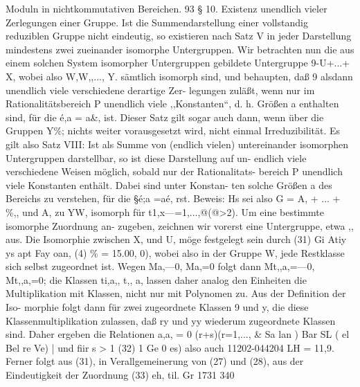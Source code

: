 \documentclass[11pt,a4paper]{article}
\theoremstyle{plain}
\theoremstyle{definition}
\begin{document}
Moduln in nichtkommutativen Bereichen. 
93 
\S{} 10. 
Existenz unendlich vieler Zerlegungen einer Gruppe. 
Ist die Summendarstellung einer vollstandig reduziblen Gruppe nicht 
eindeutig, 
so 
existieren nach Satz V in jeder Darstellung mindestens 
zwei zueinander 
isomorphe Untergruppen. 
Wir betrachten nun 
die aus 
einem solchen System isomorpher Untergruppen gebildete Untergruppe 
9-U+...+ X, wobei also W,W,,..., Y. sämtlich isomorph sind, 
und behaupten, daß 9 alsdann unendlich viele verschiedene derartige Zer- 
legungen 
zuläßt, wenn 
nur 
im Rationalitätsbereich 
P unendlich 
viele 
,,Konstanten``, d. h. Größen a enthalten sind, für die é,a = a\&, ist. Dieser 
Satz 
gilt sogar auch dann, wenn 
über die Gruppen Y\%; nichts weiter 
vorausgesetzt wird, nicht einmal Irreduzibilität. 
Es gilt also 
Satz VIII: 
Ist  als Summe von (endlich vielen) untereinander 
isomorphen Untergruppen darstellbar, so ist diese Darstellung auf un- 
endlich viele verschiedene Weisen möglich, sobald nur 
der Rationalitats- 
bereich P unendlich viele Konstanten enthält. 
Dabei sind unter Konstan- 
ten solche Größen a des Bereichs zu verstehen, für die \S{}é;a =aé, rst. 
Beweis: Hs sei also G = A, + ... + \%,, und A, zu YW, isomorph für 
t1,x---=1,...,@(@>2). 
Um eine bestimmte isomorphe Zuordnung an- 
zugeben, 
zeichnen 
wir 
vorerst 
eine Untergruppe, 
etwa ,, aus. 
Die 
Isomorphie zwischen X, und U, möge festgelegt sein durch 
(31) 
Gi 
Atiy ys 
apt Fay oan, 
(4) \% = 15.00, 
0), 
wobei also in der Gruppe W, jede Restklasse sich selbst zugeordnet ist. 
Wegen Ma,---0, Ma,=0 
folgt 
dann 
Mt,,a,=---0, Mt,,a,=0; 
die 
Klassen ti,a,, t,, 
a, lassen daher analog den Einheiten die Multiplikation 
mit Klassen, nicht nur mit Polynomen zu. 
Aus der Definition der Iso- 
morphie 
folgt dann für zwei zugeordnete Klassen 
9 und y, die diese 
Klassenmultiplikation 
zulassen, 
daß ry und yy wiederum 
zugeordnete 
Klassen sind. 
Daher ergeben die Relationen a,a, = 0 (r+s)(r=1,..., \& 
Sa lan 
) Bar SL 
( 
el 
Bel re Ve) 
| und fiir 
s > 1 
(32) 
1 
Ge 0 
es) 
also auch 
11202-044204 
LH = 11,9. 
Ferner folgt aus (31), in Verallgemeinerung von (27) und (28), aus 
der Eindeutigkeit der Zuordnung 
(33) 
eh, til. 
Gr 
1731 
340
\end{document}
